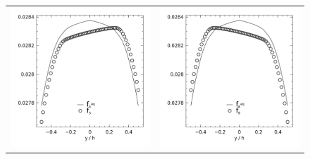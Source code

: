 \newcommand{\figwid}{2.28in}

\begin{figure}
\centering
\begin{tabulary}{\linewidth}{c c}
\includegraphics[width=\figwid]{figs/poise-bingham/bgk-5/feq-vs-f_5.png}
&
\includegraphics[width=\figwid]{figs/poise-bingham/bgk-5/feq-vs-f_8.png}

\end{tabulary}
\end{figure}
